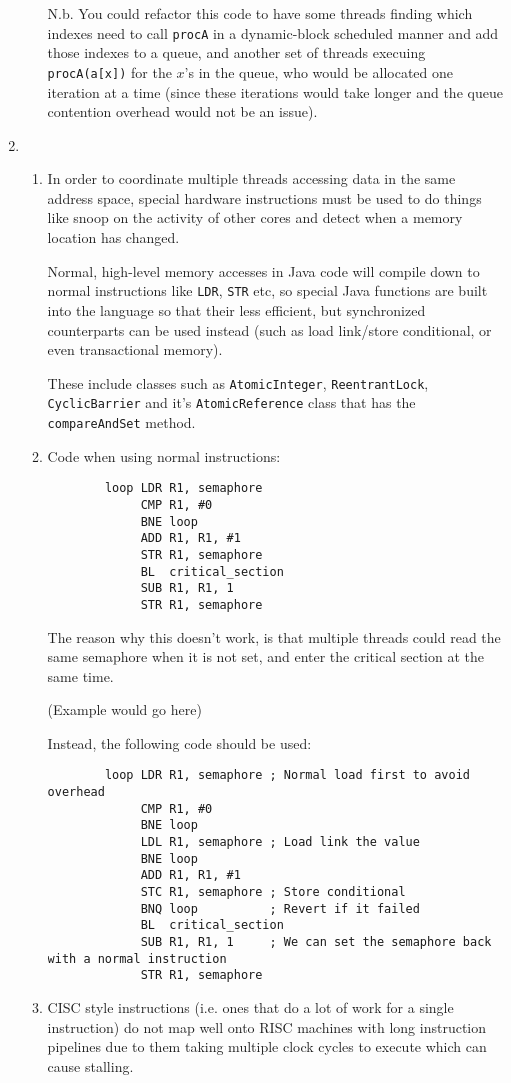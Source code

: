 \documentclass{report}
\begin{document}
\begin{enumerate}
\begin{enumerate}
    N.b. You could refactor this code to have some threads finding
    which indexes need to call \texttt{procA} in a dynamic-block
    scheduled manner and add those indexes to a queue, and another set
    of threads execuing \texttt{procA(a[x])} for the $x$'s in the
    queue, who would be allocated one iteration at a time (since these
    iterations would take longer and the queue contention overhead
    would not be an issue).
  \end{enumerate}
\item
  \begin{enumerate}
    \item In order to coordinate multiple threads accessing data in
      the same address space, special hardware instructions must be
      used to do things like snoop on the activity of other cores and
      detect when a memory location has changed.

      Normal, high-level memory accesses in Java code will compile
      down to normal instructions like \texttt{LDR}, \texttt{STR} etc,
      so special Java functions are built into the language so that
      their less efficient, but synchronized counterparts can be used
      instead (such as load link/store conditional, or even
      transactional memory).

      These include classes such as \texttt{AtomicInteger},
      \texttt{ReentrantLock}, \texttt{CyclicBarrier} and it's
      \texttt{AtomicReference} class that has the
      \texttt{compareAndSet} method.
    \item Code when using normal instructions:
      \begin{verbatim}
        loop LDR R1, semaphore
             CMP R1, #0
             BNE loop
             ADD R1, R1, #1
             STR R1, semaphore
             BL  critical_section
             SUB R1, R1, 1
             STR R1, semaphore
      \end{verbatim}
      The reason why this doesn't work, is that multiple threads could
      read the same semaphore when it is not set, and enter the
      critical section at the same time.

      (Example would go here)

      Instead, the following code should be used:

      \begin{verbatim}
        loop LDR R1, semaphore ; Normal load first to avoid overhead
             CMP R1, #0
             BNE loop
             LDL R1, semaphore ; Load link the value
             BNE loop
             ADD R1, R1, #1
             STC R1, semaphore ; Store conditional
             BNQ loop          ; Revert if it failed
             BL  critical_section
             SUB R1, R1, 1     ; We can set the semaphore back with a normal instruction
             STR R1, semaphore
      \end{verbatim}
    \item CISC style instructions (i.e. ones that do a lot of work for
      a single instruction) do not map well onto RISC machines with
      long instruction pipelines due to them taking multiple clock
      cycles to execute which can cause stalling.


\end{enumerate}
\end{enumerate}
\end{document}
